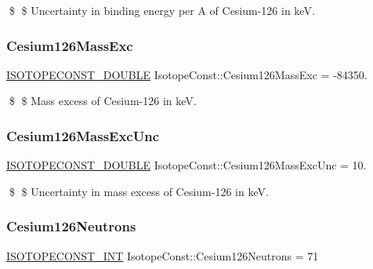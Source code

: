 \$ \$ Uncertainty in binding energy per A of Cesium-\/126 in keV. \mbox{\label{group___isotope_const-_cesium-_cs126_ga39f647b10b0d456e15a43fba09a08b17}} 
\subsubsection{\texorpdfstring{Cesium126\+Mass\+Exc}{Cesium126MassExc}}
{\footnotesize\ttfamily \mbox{\hyperlink{group___isotope_const-_macros_ga8f45a7272ce02c0b4c65c44636ed719a}{I\+S\+O\+T\+O\+P\+E\+C\+O\+N\+S\+T\+\_\+\+D\+O\+U\+B\+LE}} Isotope\+Const\+::\+Cesium126\+Mass\+Exc = -\/84350.}

\$ \$ Mass excess of Cesium-\/126 in keV. \mbox{\label{group___isotope_const-_cesium-_cs126_ga730de9a376f321fede8f138c799ed109}} 
\subsubsection{\texorpdfstring{Cesium126\+Mass\+Exc\+Unc}{Cesium126MassExcUnc}}
{\footnotesize\ttfamily \mbox{\hyperlink{group___isotope_const-_macros_ga8f45a7272ce02c0b4c65c44636ed719a}{I\+S\+O\+T\+O\+P\+E\+C\+O\+N\+S\+T\+\_\+\+D\+O\+U\+B\+LE}} Isotope\+Const\+::\+Cesium126\+Mass\+Exc\+Unc = 10.}

\$ \$ Uncertainty in mass excess of Cesium-\/126 in keV. \mbox{\label{group___isotope_const-_cesium-_cs126_ga5fc24188137bc8f521acc01267594faa}} 
\subsubsection{\texorpdfstring{Cesium126\+Neutrons}{Cesium126Neutrons}}
{\footnotesize\ttfamily \mbox{\hyperlink{group___isotope_const-_macros_ga5f18360b3e99483a35c32d789e62621c}{I\+S\+O\+T\+O\+P\+E\+C\+O\+N\+S\+T\+\_\+\+I\+NT}} Isotope\+Const\+::\+Cesium126\+Neutrons = 71}

